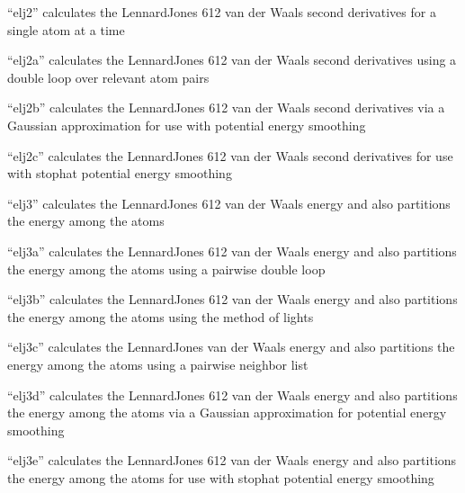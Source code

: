 \documentclass[letterpaper,11pt,english]{sphinxmanual}
\begin{document}
“elj2” calculates the Lennard\sphinxhyphen{}Jones 6\sphinxhyphen{}12 van der Waals second
derivatives for a single atom at a time


“elj2a” calculates the Lennard\sphinxhyphen{}Jones 6\sphinxhyphen{}12 van der Waals second
derivatives using a double loop over relevant atom pairs


“elj2b” calculates the Lennard\sphinxhyphen{}Jones 6\sphinxhyphen{}12 van der Waals second
derivatives via a Gaussian approximation for use with potential
energy smoothing


“elj2c” calculates the Lennard\sphinxhyphen{}Jones 6\sphinxhyphen{}12 van der Waals second
derivatives for use with stophat potential energy smoothing


“elj3” calculates the Lennard\sphinxhyphen{}Jones 6\sphinxhyphen{}12 van der Waals energy
and also partitions the energy among the atoms


“elj3a” calculates the Lennard\sphinxhyphen{}Jones 6\sphinxhyphen{}12 van der Waals
energy and also partitions the energy among the atoms using
a pairwise double loop


“elj3b” calculates the Lennard\sphinxhyphen{}Jones 6\sphinxhyphen{}12 van der Waals
energy and also partitions the energy among the atoms using
the method of lights


“elj3c” calculates the Lennard\sphinxhyphen{}Jones van der Waals energy
and also partitions the energy among the atoms using a
pairwise neighbor list


“elj3d” calculates the Lennard\sphinxhyphen{}Jones 6\sphinxhyphen{}12 van der Waals energy
and also partitions the energy among the atoms via a Gaussian
approximation for potential energy smoothing


“elj3e” calculates the Lennard\sphinxhyphen{}Jones 6\sphinxhyphen{}12 van der Waals energy
and also partitions the energy among the atoms for use with
stophat potential energy smoothing
\end{document}
